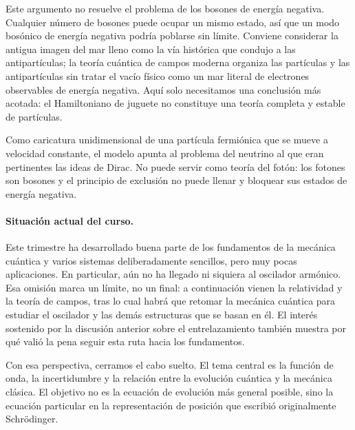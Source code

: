 Este argumento no resuelve el problema de los bosones de energía negativa. Cualquier número de bosones puede ocupar un mismo estado, así que un modo bosónico de energía negativa podría poblarse sin límite. Conviene considerar la antigua imagen del mar lleno como la vía histórica que condujo a las antipartículas; la teoría cuántica de campos moderna organiza las partículas y las antipartículas sin tratar el vacío físico como un mar literal de electrones observables de energía negativa. Aquí solo necesitamos una conclusión más acotada: el Hamiltoniano de juguete no constituye una teoría completa y estable de partículas.

Como caricatura unidimensional de una partícula fermiónica que se mueve a velocidad constante, el modelo apunta al problema del neutrino al que eran pertinentes las ideas de Dirac. No puede servir como teoría del fotón: los fotones son bosones y el principio de exclusión no puede llenar y bloquear sus estados de energía negativa.

\begin{classroomqa}
\end{classroomqa}

\paragraph{Situación actual del curso.}
Este trimestre ha desarrollado buena parte de los fundamentos de la mecánica cuántica y varios sistemas deliberadamente sencillos, pero muy pocas aplicaciones. En particular, aún no ha llegado ni siquiera al oscilador armónico. Esa omisión marca un límite, no un final: a continuación vienen la relatividad y la teoría de campos, tras lo cual habrá que retomar la mecánica cuántica para estudiar el oscilador y las demás estructuras que se basan en él. El interés sostenido por la discusión anterior sobre el entrelazamiento también muestra por qué valió la pena seguir esta ruta hacia los fundamentos.

Con esa perspectiva, cerramos el cabo suelto. El tema central es la función de onda, la incertidumbre y la relación entre la evolución cuántica y la mecánica clásica. El objetivo no es la ecuación de evolución más general posible, sino la ecuación particular en la representación de posición que escribió originalmente Schr\"odinger.

